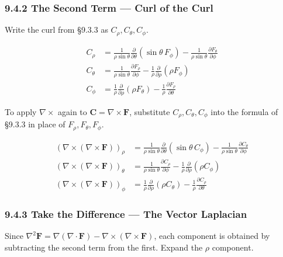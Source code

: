 \documentclass[a4paper,12pt,openany]{book}
\begin{document}
\hypertarget{the-second-term-curl-of-the-curl}{%
\subsubsection{9.4.2 The Second Term — Curl of the
Curl}\label{the-second-term-curl-of-the-curl}}

Write the curl from §9.3.3 as \(C_\rho, C_\theta, C_\phi\).

\[\begin{aligned}
C_\rho &= \frac{1}{\rho\sin\theta}\frac{\partial}{\partial\theta}(\sin\theta\,F_\phi) - \frac{1}{\rho\sin\theta}\frac{\partial F_\theta}{\partial\phi} \\[0.3em]
C_\theta &= \frac{1}{\rho\sin\theta}\frac{\partial F_\rho}{\partial\phi} - \frac{1}{\rho}\frac{\partial}{\partial\rho}(\rho F_\phi) \\[0.3em]
C_\phi &= \frac{1}{\rho}\frac{\partial}{\partial\rho}(\rho F_\theta) - \frac{1}{\rho}\frac{\partial F_\rho}{\partial\theta}
\end{aligned}\]

To apply \(\nabla\times\) again to
\(\mathbf{C} = \nabla\times\mathbf{F}\), substitute
\(C_\rho, C_\theta, C_\phi\) into the formula of §9.3.3 in place of
\(F_\rho, F_\theta, F_\phi\).

\[\begin{aligned}
(\nabla\times(\nabla\times\mathbf{F}))_\rho &= \frac{1}{\rho\sin\theta}\frac{\partial}{\partial\theta}(\sin\theta\,C_\phi) - \frac{1}{\rho\sin\theta}\frac{\partial C_\theta}{\partial\phi} \\[0.5em]
(\nabla\times(\nabla\times\mathbf{F}))_\theta &= \frac{1}{\rho\sin\theta}\frac{\partial C_\rho}{\partial\phi} - \frac{1}{\rho}\frac{\partial}{\partial\rho}(\rho C_\phi) \\[0.5em]
(\nabla\times(\nabla\times\mathbf{F}))_\phi &= \frac{1}{\rho}\frac{\partial}{\partial\rho}(\rho C_\theta) - \frac{1}{\rho}\frac{\partial C_\rho}{\partial\theta}
\end{aligned}\]

\hypertarget{take-the-difference-the-vector-laplacian}{%
\subsubsection{9.4.3 Take the Difference — The Vector
Laplacian}\label{take-the-difference-the-vector-laplacian}}

Since
\(\nabla^2\mathbf{F} = \nabla(\nabla\cdot\mathbf{F}) - \nabla\times(\nabla\times\mathbf{F})\),
each component is obtained by subtracting the second term from the
first. Expand the \(\rho\) component.
\end{document}
